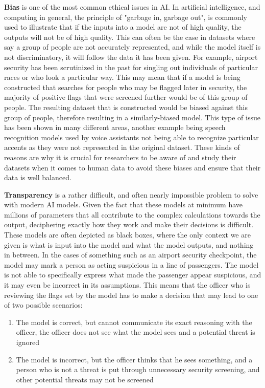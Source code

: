 \textbf{Bias} is one of the most common ethical issues in AI. In artificial intelligence, and computing in general, the principle of "garbage in, garbage out", is commonly used to illustrate that if the inputs into a model are not of high quality, the outputs will not be of high quality. This can often be the case in datasets where say a group of people are not accurately represented, and while the model itself is not discriminatory, it will follow the data it has been given. For example, airport security has been scrutinized in the past for singling out individuals of particular races or who look a particular way. This may mean that if a model is being constructed that searches for people who may be flagged later in security, the majority of positive flags that were screened further would be of this group of people. The resulting dataset that is constructed would be biased against this group of people, therefore resulting in a similarly-biased model. This type of issue has been shown in many different areas, another example being speech recognition models used by voice assistants not being able to recognize particular accents as they were not represented in the original dataset. These kinds of reasons are why it is crucial for researchers to be aware of and study their datasets when it comes to human data to avoid these biases and ensure that their data is well balanced.

\textbf{Transparency} is a rather difficult, and often nearly impossible problem to solve with modern AI models. Given the fact that these models at minimum have millions of parameters that all contribute to the complex calculations towards the output, deciphering exactly how they work and make their decisions is difficult. These models are often depicted as black boxes, where the only context we are given is what is input into the model and what the model outputs, and nothing in between. In the cases of something such as an airport security checkpoint, the model may mark a person as acting suspicious in a line of passengers. The model is not able to specifically express what made the passenger appear suspicious, and it may even be incorrect in its assumptions. This means that the officer who is reviewing the flags set by the model has to make a decision that may lead to one of two possible scenarios:

\begin{enumerate}
	\item The model is correct, but cannot communicate its exact reasoning with the officer, the officer does not see what the model sees and a potential threat is ignored
	\item The model is incorrect, but the officer thinks that he sees something, and a person who is not a threat is put through unnecessary security screening, and other potential threats may not be screened
\end{enumerate}

